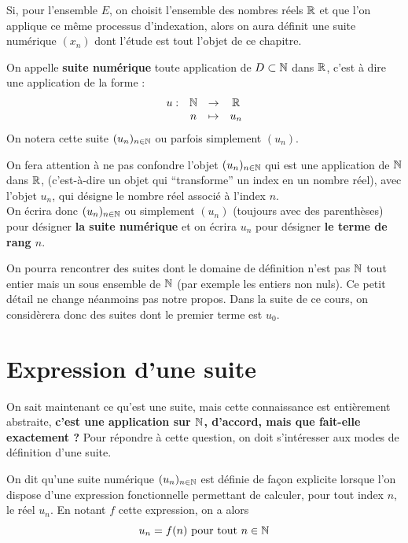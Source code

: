 \documentclass[frenchb]{report}
\begin{document}
Si, pour l'ensemble $E$, on choisit l'ensemble des nombres réels $\mathbb{R}$ et que l'on applique ce même processus d'indexation, alors on aura définit une suite numérique $(x_n)$ dont l'étude est tout l'objet de ce chapitre.

\begin{defn}
On appelle \textbf{suite numérique} toute application de $D \subset \mathbb{N}$ dans $\mathbb{R}$, c'est à dire une application de la forme :
\[ \begin{array}{c c c c}
u : & \mathbb{N} & \to & \mathbb{R} \\
& n & \mapsto & u_n
\end{array} \]
On notera cette suite $(u_n)_{n \in \mathbb{N}}$ ou parfois simplement $(u_n)$.
\end{defn}

\begin{nota}
On fera attention à ne pas confondre l'objet $(u_n)_{n \in \mathbb{N}}$ qui est une application de $\mathbb{N}$ dans $\mathbb{R}$, (c'est-à-dire un objet qui ``transforme'' un index en un nombre réel), avec l'objet $u_n$, qui désigne le nombre réel associé à l'index $n$. \\
On écrira donc $(u_n)_{n \in \mathbb{N}}$ ou simplement $(u_n)$ (toujours avec des parenthèses) pour désigner \textbf{la suite numérique} et on écrira $u_n$ pour désigner \textbf{le terme de rang $n$}.
\end{nota} 

\begin{rmq}
On pourra rencontrer des suites dont le domaine de définition n'est pas $\mathbb{N}$ tout entier mais un sous ensemble de $\mathbb{N}$ (par exemple les entiers non nuls). Ce petit détail ne change néanmoins pas notre propos.
Dans la suite de ce cours, on considèrera donc des suites dont le premier terme est $u_0$.
\end{rmq}

\section{Expression d'une suite}

On sait maintenant ce qu'est une suite, mais cette connaissance est entièrement abstraite, \textbf{c'est une application sur $\mathbb{N}$, d'accord, mais que fait-elle exactement ?} Pour répondre à cette question, on doit s'intéresser aux modes de définition d'une suite.

\begin{defn}
On dit qu'une suite numérique $(u_n)_{n \in \mathbb{N}}$ est définie de façon explicite lorsque l'on dispose d'une expression fonctionnelle permettant de calculer, pour tout index $n$, le réel $u_n$. En notant $f$ cette expression, on a alors 
\[ u_n = f(n) \text{ pour tout } n \in \mathbb{N} \]
\end{defn}
\end{document}
